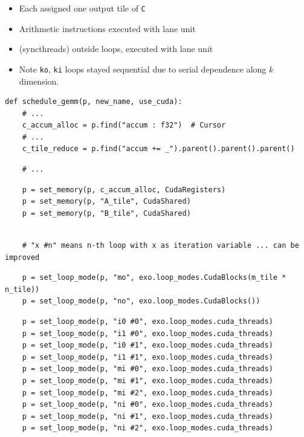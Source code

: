 \begin{minipage}[t]{0.5\textwidth}\codeminipage
\begin{itemize}
  \item Each  assigned one output tile of \texttt{C}
  \item Arithmetic instructions executed with lane unit 
  \item {} (syncthreads) outside  loops, executed with lane unit 
  \item Note \texttt{ko}, \texttt{ki} loops stayed sequential due to serial dependence along $k$ dimension.
\end{itemize}
\vspace{6mm}
{\tiny
\begin{verbatim}
def schedule_gemm(p, new_name, use_cuda):
    # ...
    c_accum_alloc = p.find("accum : f32")  # Cursor
    # ...
    c_tile_reduce = p.find("accum += _").parent().parent().parent()
\end{verbatim}
\begin{verbatim}
    # ...

\end{verbatim}
\begin{mdframed}[style=MyFrame, backgroundcolor=yellowBoxBg]
\color{yellowBoxFg}
\begin{verbatim}
    p = set_memory(p, c_accum_alloc, CudaRegisters)
    p = set_memory(p, "A_tile", CudaShared)
    p = set_memory(p, "B_tile", CudaShared)
\end{verbatim}
\end{mdframed}
\begin{verbatim}

    # "x #n" means n-th loop with x as iteration variable ... can be improved
\end{verbatim}
\begin{mdframed}[style=MyFrame, backgroundcolor=redBoxBg]
\color{redBoxFg}
\begin{verbatim}
    p = set_loop_mode(p, "mo", exo.loop_modes.CudaBlocks(m_tile * n_tile))
    p = set_loop_mode(p, "no", exo.loop_modes.CudaBlocks())
\end{verbatim}
\end{mdframed}
\begin{mdframed}[style=MyFrame, backgroundcolor=blueBoxBg]
\color{blueBoxFg}
\begin{verbatim}
    p = set_loop_mode(p, "i0 #0", exo.loop_modes.cuda_threads)
    p = set_loop_mode(p, "i1 #0", exo.loop_modes.cuda_threads)
    p = set_loop_mode(p, "i0 #1", exo.loop_modes.cuda_threads)
    p = set_loop_mode(p, "i1 #1", exo.loop_modes.cuda_threads)
    p = set_loop_mode(p, "mi #0", exo.loop_modes.cuda_threads)
    p = set_loop_mode(p, "mi #1", exo.loop_modes.cuda_threads)
    p = set_loop_mode(p, "mi #2", exo.loop_modes.cuda_threads)
    p = set_loop_mode(p, "ni #0", exo.loop_modes.cuda_threads)
    p = set_loop_mode(p, "ni #1", exo.loop_modes.cuda_threads)
    p = set_loop_mode(p, "ni #2", exo.loop_modes.cuda_threads)
\end{verbatim}
\end{mdframed}
\begin{verbatim}


\end{verbatim}}
\end{minipage}

